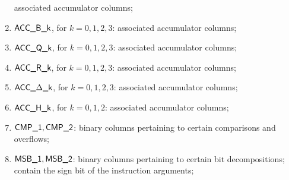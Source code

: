 \begin{enumerate}
		associated accumulator columns;
	\item $\textsf{ACC}\textsf{\_B\_k}$, for $k=0,1,2,3$:
		associated accumulator columns;
	\item $\textsf{ACC}\textsf{\_Q\_k}$, for $k=0,1,2,3$:
		associated accumulator columns;
	\item $\textsf{ACC}\textsf{\_R\_k}$, for $k=0,1,2,3$:
		associated accumulator columns;
	\item $\textsf{ACC}\textsf{\_$\Delta$\_k}$, for $k=0,1,2,3$:
		associated accumulator columns;
	\item $\textsf{ACC}\textsf{\_H\_k}$, for $k=0,1,2$:
		associated accumulator columns;
	\item $\textsf{CMP\_1}, \textsf{CMP\_2}$:
		binary columns pertaining to certain comparisons and overflows;
	\item $\textsf{MSB\_1}, \textsf{MSB\_2}$:
		binary columns pertaining to certain bit decompositions;
		contain the sign bit of the instruction arguments;
\end{enumerate}
